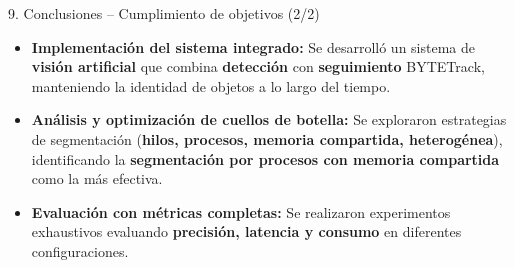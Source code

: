 \documentclass[spanish]{beamer}
\begin{document}
\begin{frame}{9. Conclusiones -- Cumplimiento de objetivos (2/2)}
    \begin{itemize}
        \item \textbf{Implementación del sistema integrado:} Se desarrolló un sistema de \textbf{visión artificial} que combina \textbf{detección} con \textbf{seguimiento} BYTETrack, manteniendo la identidad de objetos a lo largo del tiempo.
        \item \textbf{Análisis y optimización de cuellos de botella:} Se exploraron estrategias de segmentación (\textbf{hilos, procesos, memoria compartida, heterogénea}), identificando la \textbf{segmentación por procesos con memoria compartida} como la más efectiva.
        \item \textbf{Evaluación con métricas completas:} Se realizaron experimentos exhaustivos evaluando \textbf{precisión, latencia y consumo} en diferentes configuraciones.
    \end{itemize}
\end{frame}


\begin{frame}
    \titlepage
\end{frame}
\end{document}

